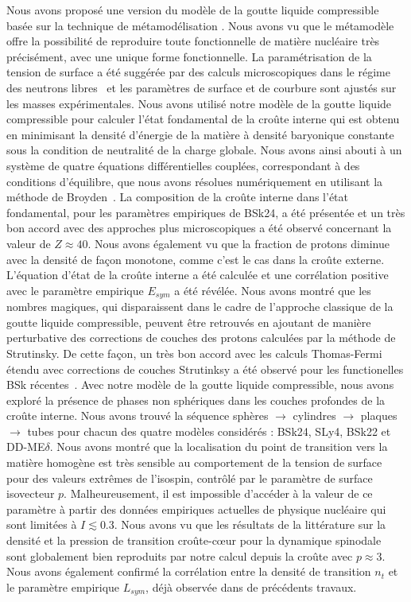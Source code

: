 Nous avons proposé une version du modèle de la goutte liquide compressible
basée sur la technique de métamodélisation 
\cite{Margueron2018a,Margueron2018b}. Nous avons vu que le métamodèle offre la 
possibilité de reproduire toute fonctionnelle de matière nucléaire très 
précisément, avec une unique forme fonctionnelle. La paramétrisation de 
la tension de surface a été suggérée par des calculs microscopiques dans le 
régime des neutrons libres~\cite{Ravenhall1983} et les paramètres de surface et 
de courbure sont ajustés sur les masses expérimentales. Nous avons utilisé 
notre modèle de la goutte liquide compressible pour calculer l'état fondamental 
de la croûte interne qui est obtenu en minimisant la densité d'énergie de la 
matière à densité baryonique constante sous la condition de neutralité 
de la charge globale. Nous avons ainsi abouti à un système de quatre équations 
différentielles couplées, correspondant à des conditions d'équilibre, que nous 
avons résolues numériquement en utilisant la méthode de 
Broyden~\cite{Broyden1965}.
%
La composition de la croûte interne dans l'état fondamental, pour les 
paramètres empiriques de BSk24, a été présentée et un très bon accord avec des 
approches plus microscopiques a été observé concernant la valeur de 
$Z \approx 40$. Nous avons également vu que la fraction de protons diminue avec 
la densité de façon monotone, comme c'est le cas dans la croûte externe. 
L'équation d'état de la croûte interne a été calculée et une corrélation 
positive avec le paramètre empirique $E_{sym}$ a été révélée. Nous avons montré 
que les nombres magiques, qui disparaissent dans le cadre de l'approche
classique de la goutte liquide compressible, peuvent être retrouvés en ajoutant 
de manière perturbative des corrections de couches des protons calculées par la 
méthode de Strutinsky. De cette façon, un très bon accord avec les calculs 
Thomas-Fermi étendu avec corrections de couches Strutinksy a été observé pour 
les functionelles BSk récentes~\cite{Pearson2018}. Avec notre modèle de la
goutte liquide compressible, nous avons exploré la présence de phases 
non sphériques dans les couches profondes de la croûte interne. Nous avons 
trouvé la séquence sphères $\rightarrow$ cylindres $\rightarrow$ plaques
$\rightarrow$ tubes pour chacun des quatre modèles considérés : BSk24, SLy4, 
BSk22 et DD-ME$\delta$. Nous avons montré que la localisation du point de 
transition vers la matière homogène est très sensible au comportement de la 
tension de surface pour des valeurs extrêmes de l'isospin, contrôlé par le 
paramètre de surface isovecteur $p$. 
%
Malheureusement, il est impossible d'accéder à la valeur de ce paramètre à 
partir des données empiriques actuelles de physique nucléaire 
qui sont limitées à $I \lesssim 0.3$. Nous avons vu que 
les résultats de la littérature sur la densité et la pression de transition 
croûte-c\oe ur pour la dynamique spinodale~\cite{Ducoin2011} sont globalement 
bien reproduits par notre calcul depuis la croûte avec $p \approx 3$. Nous 
avons également confirmé la corrélation entre la densité de transition $n_t$ et 
le paramètre empirique $L_{sym}$, déjà observée dans de précédents travaux.

